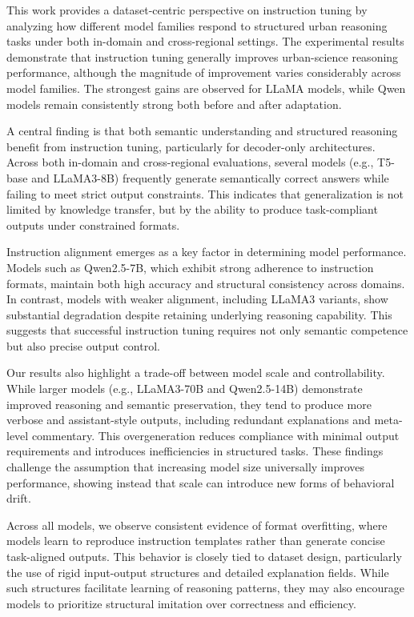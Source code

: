 \documentclass[a4paper,fleqn]{cas-sc}
\begin{document}
This work provides a dataset-centric perspective on instruction tuning by analyzing how different model families respond to structured urban reasoning tasks under both in-domain and cross-regional settings. The experimental results demonstrate that instruction tuning generally improves urban-science reasoning performance, although the magnitude of improvement varies considerably across model families. The strongest gains are observed for LLaMA models, while Qwen models remain consistently strong both before and after adaptation.

A central finding is that both semantic understanding and structured reasoning benefit from instruction tuning, particularly for decoder-only architectures. Across both in-domain and cross-regional evaluations, several models (e.g., T5-base and LLaMA3-8B) frequently generate semantically correct answers while failing to meet strict output constraints. This indicates that generalization is not limited by knowledge transfer, but by the ability to produce task-compliant outputs under constrained formats.

Instruction alignment emerges as a key factor in determining model performance. Models such as Qwen2.5-7B, which exhibit strong adherence to instruction formats, maintain both high accuracy and structural consistency across domains. In contrast, models with weaker alignment, including LLaMA3 variants, show substantial degradation despite retaining underlying reasoning capability. This suggests that successful instruction tuning requires not only semantic competence but also precise output control.

Our results also highlight a trade-off between model scale and controllability. While larger models (e.g., LLaMA3-70B and Qwen2.5-14B) demonstrate improved reasoning and semantic preservation, they tend to produce more verbose and assistant-style outputs, including redundant explanations and meta-level commentary. This overgeneration reduces compliance with minimal output requirements and introduces inefficiencies in structured tasks. These findings challenge the assumption that increasing model size universally improves performance, showing instead that scale can introduce new forms of behavioral drift.

Across all models, we observe consistent evidence of format overfitting, where models learn to reproduce instruction templates rather than generate concise task-aligned outputs. This behavior is closely tied to dataset design, particularly the use of rigid input-output structures and detailed explanation fields. While such structures facilitate learning of reasoning patterns, they may also encourage models to prioritize structural imitation over correctness and efficiency.
\end{document}
